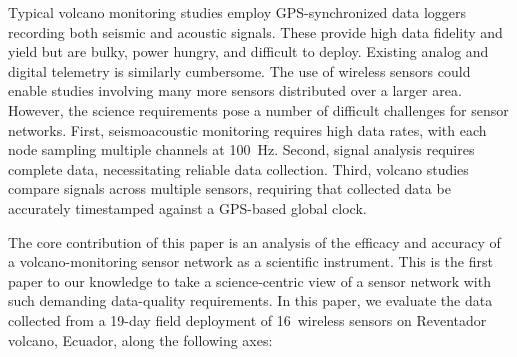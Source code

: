 
Typical volcano monitoring studies employ GPS-synchronized data
loggers recording both seismic and acoustic signals. These provide 
high data fidelity and yield but are bulky, power
hungry, and difficult to deploy. Existing analog and digital
telemetry is similarly cumbersome. 
The use of wireless sensors could enable studies involving many 
more sensors distributed over a larger area. However, the 
science requirements pose a number of difficult challenges for sensor
networks.  First, seismoacoustic monitoring requires high data rates, 
with each node sampling multiple channels at 100~Hz. Second,
signal analysis requires complete data, necessitating reliable 
data collection. Third, volcano studies compare signals
across multiple sensors, requiring that collected data be accurately 
timestamped against a GPS-based global clock.


The core contribution of this paper is an analysis of the efficacy 
and accuracy of a volcano-monitoring sensor network as a scientific 
instrument. This is the
first paper to our knowledge to take a science-centric view of 
a sensor network with such demanding data-quality requirements. 
In this paper, we evaluate the data collected from 
a 19-day field deployment of 16~wireless sensors on 
Reventador volcano, Ecuador, along the following axes:

